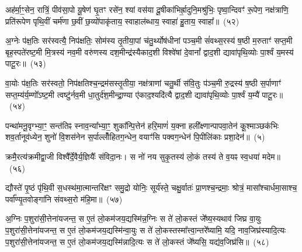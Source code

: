 अह॑र्मा॒ꣳ॒सेन॒ रात्रिं॒ पीव॑सा॒पो यू॒षेण॑ घृ॒तꣳ रसे॑न॒ श्यां वस॑या दू॒षीका॑भिर्\mbox{}ह्रा॒दुनि॒मश्रु॑भिः॒ पृष्वा॒न्दिवꣳ॑ रू॒पेण॒ नक्ष॑त्राणि॒ प्रति॑रूपेण पृथि॒वीं चर्म॑णा छ॒वीं छ॒व्यो॑पाकृ॑ताय॒ स्वाहाल॑ब्धाय॒ स्वाहा॑ हु॒ताय॒ स्वाहा᳚॥~(५२)

{\anuvakamend[{अह॑र॒ष्टाविꣳ॑शतिः}]}%

अ॒ग्नेः प॑क्ष॒तिः सर॑स्वत्यै॒ निप॑क्षतिः॒ सोम॑स्य तृ॒तीया॒पां च॑तु॒र्थ्योष॑धीनां पञ्च॒मी सं॑वथ्स॒रस्य॑ ष॒ष्ठी म॒रुताꣳ॑ सप्त॒मी बृह॒स्पते॑रष्ट॒मी मि॒त्रस्य॑ नव॒मी वरु॑णस्य दश॒मीन्द्र॑स्यैकाद॒शी विश्वे॑षां दे॒वानां᳚ द्वाद॒शी द्यावा॑पृथि॒व्योः पा॒र्श्वं य॒मस्य॑ पाटू॒रः॥~(५३)

{\anuvakamend[{अ॒ग्नेरेका॒न्नत्रि॒ꣳ॒शत्}]}%

वा॒योः प॑क्ष॒तिः सर॑स्वतो॒ निप॑क्षतिश्च॒न्द्रम॑सस्तृ॒तीया॒ नक्ष॑त्राणां चतु॒र्थी स॑वि॒तुः प॑ञ्च॒मी रु॒द्रस्य॑ ष॒ष्ठी स॒र्पाणाꣳ॑ सप्त॒म्य॑र्य॒म्णो᳚\-ऽष्ट॒मी त्वष्टु॑र्नव॒मी धा॒तुर्द॑श॒मीन्द्रा॒ण्या ए॑काद॒श्यदि॑त्यै द्वाद॒शी द्यावा॑पृथि॒व्योः पा॒र्श्वं य॒म्यै॑ पाटू॒रः॥~(५४)

{\anuvakamend[{वा॒योर॒ष्टाविꣳ॑शतिः}]}%

पन्था॑मनू॒वृग्भ्या॒ꣳ॒ सन्त॑तिꣴ स्नाव॒न्या᳚भ्या॒ꣳ॒ शुका᳚न्पि॒त्तेन॑ हरि॒माणं॑ य॒क्ना हली᳚क्ष्णान्पापवा॒तेन॑ कू॒श्माञ्छक॑भिः शव॒र्तानूव॑ध्येन॒ शुनो॑ वि॒शस॑नेन स॒र्पाल्लोँ॑हितग॒न्धेन॒ वयाꣳ॑सि पक्वग॒न्धेन॑ पि॒पीलि॑काः प्रशा॒देन॑॥~(५)

{\anuvakamend[{पन्था॒न्द्वाविꣳ॑शतिः}]}%

क्रमै॒रत्य॑क्रमीद्वा॒जी विश्वै᳚र्दे॒वैर्य॒ज्ञियैः᳚ संविदा॒नः। स नो॑ नय सुकृ॒तस्य॑ लो॒कं तस्य॑ ते व॒यꣴ स्व॒धया॑ मदेम॥~(५६)

{\anuvakamend[{क्रमै॑र॒ष्टाद॑श}]}%

द्यौस्ते॑ पृ॒ष्ठं पृ॑थि॒वी स॒धस्थ॑मा॒त्मान्तरि॑क्षꣳ समु॒द्रो योनिः॒ सूर्य॑स्ते॒ चक्षु॒र्वातः॑ प्रा॒णश्च॒न्द्रमाः॒ श्रोत्रं॒ मासा᳚श्चार्धमा॒साश्च॒ पर्वा᳚ण्यृ॒तवोङ्गा॑नि संवथ्स॒रो म॑हि॒मा॥~(५७)

{\anuvakamend[{द्यौः पञ्च॑विꣳशतिः}]}%

अ॒ग्निः प॒शुरा॑सी॒त्तेना॑यजन्त॒ स ए॒तं लो॒कम॑जय॒द्यस्मि॑न्न॒ग्निः स ते॑ लो॒कस्तं जे᳚ष्य॒स्यथाव॑ जिघ्र वा॒युः प॒शुरा॑सी॒त्तेना॑यजन्त॒ स ए॒तं लो॒कम॑जय॒द्यस्मि॑न्वा॒युः स ते॑ लो॒कस्तस्मा᳚त्त्वा॒न्तरे᳚ष्यामि॒ यदि॒ नाव॒जिघ्र॑स्यादि॒त्यः प॒शुरा॑सी॒त्तेना॑यजन्त॒ स ए॒तं लो॒कम॑जय॒द्यस्मि॑न्नादि॒त्यः स ते॑ लो॒कस्तं जे᳚ष्यसि॒ यद्य॑व॒जिघ्र॑सि॥~(५८)

{\anuvakamend[{यस्मि॑न्न॒ष्टौ च॑}]}%


{\anuvakamend[{प्रा॒चीन॑वꣳशं॒ याव॑न्त ऋख्सा॒मे वाग्वै दे॒वेभ्यो॑ दे॒वा वै दे॑व॒यज॑नङ्क॒द्रूश्च॒ तद्धिर॑ण्य॒ꣳ॒ षट्प॒दानि॑ ब्रह्मवा॒दिनो॑ वि॒चित्यो॒ यत्क॒लया॑ ते वारु॒णो वै क्री॒तः सोम॒ एका॑\-दश}]}%

